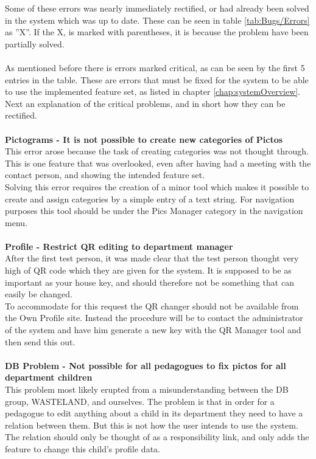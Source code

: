 Some of these errors was nearly immediately rectified, or had already been solved in the system which was up to date. These can be seen in table \ref{tab:Bugs/Errors} as ''X''. If the X, is marked with parentheses, it is because the problem have been partially solved.\\
\\
As mentioned before there is errors marked critical, as can be seen by the first 5 entries in the table. These are errors that must be fixed for the system to be able to use the implemented feature set, as listed in chapter \vref{chap:systemOverview}.\\
Next an explanation of the critical problems, and in short how they can be rectified.\\
\\
\textbf{Pictograms - It is not possible to create new categories of Pictos}\\
This error arose because the task of creating categories was not thought through. This is one feature that was overlooked, even after having had a meeting with the contact person, and showing the intended feature set.\\
Solving this error requires the creation of a minor tool which makes it possible to create and assign categories by a simple entry of a text string. For navigation purposes this tool should be under the Pics Manager category in the navigation menu.\\
\\
\textbf{Profile - Restrict QR editing to department manager}\\
After the first test person, it was made clear that the test person thought very high of QR code which they are given for the system. It is supposed to be as important as your house key, and should therefore not be something that can easily be changed.\\
To accommodate for this request the QR changer should not be available from the Own Profile site. Instead the procedure will be to contact the administrator of the system and have him generate a new key with the QR Manager tool and then send this out.\\
\\
\textbf{DB Problem - Not possible for all pedagogues to fix pictos for all department children}\\
This problem most likely erupted from a misunderstanding between the DB group, WASTELAND, and ourselves. The problem is that in order for a pedagogue to edit anything about a child in its department they need to have a relation between them. But this is not how the user intends to use the system. The relation should only be thought of as a responsibility link, and only adds the feature to change this child's profile data.\\

